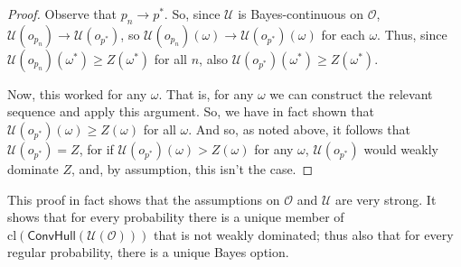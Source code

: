 \documentclass[a4paper]{article}
\newcommand\cl{\mathrm{cl}}
\renewcommand\O{\mathcal{O}}
\newcommand\Uwald{\mathcal{U}} %
\newcommand{\Conv}{\mathsf{ConvHull}}
\renewcommand{\geq}{\geqslant}
\newenvironment{CCM rewritten}
{\begingroup\color{blue}} %
{\endgroup}              %
\begin{document}
\begin{proof}
		
		Observe that $p_n\longrightarrow p^*$. So, since $\Uwald$ is Bayes-continuous on $\O$, $\Uwald(o_{p_n})\longrightarrow \Uwald(o_{p^*})$, so $\Uwald(o_{p_n})({\omega})\longrightarrow \Uwald(o_{p^*})({\omega})$ for each ${\omega}$. Thus, since $\Uwald(o_{p_n})({\omega^*})\geq Z({\omega^*})$ for all $n$, also $\Uwald(o_{p^*})(\omega^*)\geq Z(\omega^*)$. 
		
		Now, this worked for any $\omega$. That is, for any $\omega$ we can construct the relevant sequence and apply this argument. So, we have in fact shown that $\Uwald(o_{p^*})(\omega)\geq Z(\omega)$ for all $\omega$. And so, as noted above, it follows that $\Uwald(o_{p^*})=Z$, for if $\Uwald(o_{p^*})(\omega) > Z(\omega)$ for any $\omega$, $\Uwald(o_{p^*})$ would weakly dominate $Z$, and, by assumption, this isn't the case.
	\end{proof}
	This proof in fact shows that the assumptions on $\O$ and $\Uwald$ are very strong. It shows that for every probability there is a unique member of $\cl(\Conv(\Uwald(\O)))$ that is not weakly dominated; thus also that for every regular probability, there is a unique Bayes option. 
	
\end{document}
